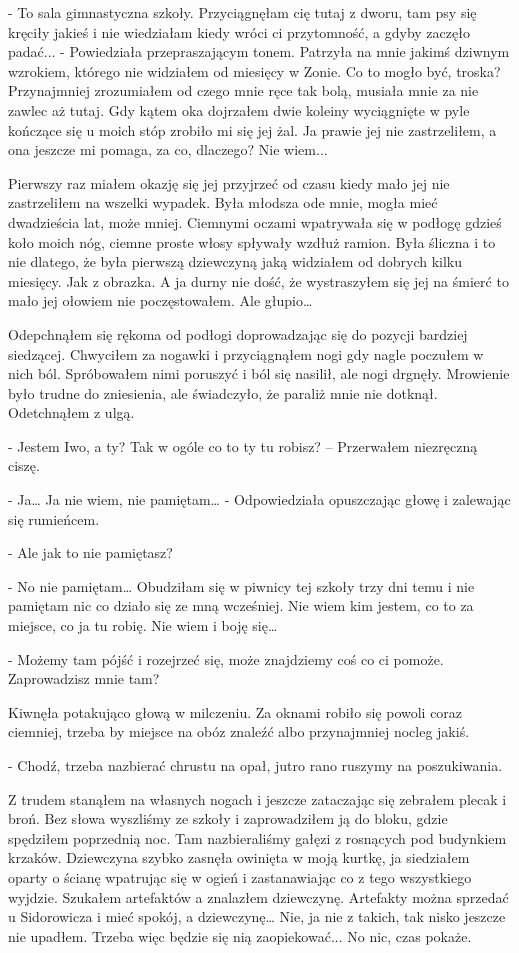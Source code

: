 \documentclass[../MAIN.tex]{subfiles}
\begin{document}
- To sala gimnastyczna szkoły. Przyciągnęłam cię tutaj z dworu, tam psy się kręciły jakieś i nie wiedziałam kiedy wróci ci przytomność, a gdyby zaczęło padać... - Powiedziała przepraszającym tonem. Patrzyła na mnie jakimś dziwnym wzrokiem, którego nie widziałem od miesięcy w Zonie. Co to mogło być, troska? Przynajmniej zrozumiałem od czego mnie ręce tak bolą, musiała mnie za nie zawlec aż tutaj. Gdy kątem oka dojrzałem dwie koleiny wyciągnięte w pyle kończące się u moich stóp zrobiło mi się jej żal. Ja prawie jej nie zastrzeliłem, a ona jeszcze mi pomaga, za co, dlaczego? Nie wiem...

Pierwszy raz miałem okazję się jej przyjrzeć od czasu kiedy mało jej nie zastrzeliłem na wszelki wypadek. Była młodsza ode mnie, mogła mieć dwadzieścia lat, może mniej. Ciemnymi oczami wpatrywała się w podłogę gdzieś koło moich nóg, ciemne proste włosy spływały wzdłuż ramion. Była śliczna i to nie dlatego, że była pierwszą dziewczyną jaką widziałem od dobrych kilku miesięcy. Jak z obrazka. A ja durny nie dość, że wystraszyłem się jej na śmierć to mało jej ołowiem nie poczęstowałem. Ale głupio…

Odepchnąłem się rękoma od podłogi doprowadzając się do pozycji bardziej siedzącej. Chwyciłem za nogawki i przyciągnąłem nogi gdy nagle poczułem w nich ból. Spróbowałem nimi poruszyć i ból się nasilił, ale nogi drgnęły. Mrowienie było trudne do zniesienia, ale świadczyło, że paraliż mnie nie dotknął. Odetchnąłem z ulgą.

- Jestem Iwo, a ty? Tak w ogóle co to ty tu robisz? – Przerwałem niezręczną ciszę.

- Ja… Ja nie wiem, nie pamiętam… - Odpowiedziała opuszczając głowę i zalewając się rumieńcem.

- Ale jak to nie pamiętasz?

- No nie pamiętam… Obudziłam się w piwnicy tej szkoły trzy dni temu i nie pamiętam nic co działo się ze mną wcześniej. Nie wiem kim jestem, co to za miejsce, co ja tu robię. Nie wiem i boję się…

- Możemy tam pójść i rozejrzeć się, może znajdziemy coś co ci pomoże. Zaprowadzisz mnie tam?

Kiwnęła potakująco głową w milczeniu. Za oknami robiło się powoli coraz ciemniej, trzeba by miejsce na obóz znaleźć albo przynajmniej nocleg jakiś.

- Chodź, trzeba nazbierać chrustu na opał, jutro rano ruszymy na poszukiwania.

Z trudem stanąłem na własnych nogach i jeszcze zataczając się zebrałem plecak i broń. Bez słowa wyszliśmy ze szkoły i zaprowadziłem ją do bloku, gdzie spędziłem poprzednią noc. Tam nazbieraliśmy gałęzi z rosnących pod budynkiem krzaków. Dziewczyna szybko zasnęła owinięta w moją kurtkę, ja siedziałem oparty o ścianę wpatrując się w ogień i zastanawiając co z tego wszystkiego wyjdzie. Szukałem artefaktów a znalazłem dziewczynę. Artefakty można sprzedać u Sidorowicza i mieć spokój, a dziewczynę… Nie, ja nie z takich, tak nisko jeszcze nie upadłem. Trzeba więc będzie się nią zaopiekować... No nic, czas pokaże.
\end{document}

